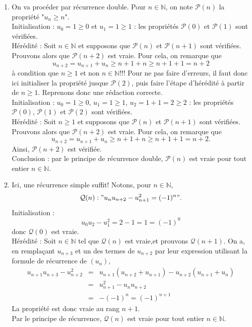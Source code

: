 \documentclass[11pt,a4paper]{article}
\begin{document}
	\begin{corrige}
		\begin{enumerate}
			
			\item  On va procéder par récurrence double. Pour $n\in\mathbb N$, on note $\mathcal P(n)$ la propriété "$u_n\geq n$".\\
			
			Initialisation : $u_0=1\geq 0$ et $u_1=1\geq 1$ : les propriétés $\mathcal P(0)$ et $\mathcal P(1)$ sont vérifiées.\\
			
			Hérédité : Soit $n\in\mathbb N$ et supposons que $\mathcal P(n)$ et $\mathcal P(n+1)$ sont vérifiées. Prouvons alors que $\mathcal P(n+2)$ est vraie. Pour cela, on remarque que 
			$$u_{n+2}=u_{n+1}+u_n\geq n+1+n\geq n+1+1=n+2$$
			à condition que $n\geq 1$ et non $n\in\mathbb N$!!! Pour ne pas faire d'erreurs, il faut donc ici initialiser la propriété jusque $\mathcal P(2)$, puis faire l'étape d'hérédité à partir de $n\geq 1$. Reprenons donc une rédaction correcte.\\
			
			Initialisation : $u_0=1\geq 0$, $u_1=1\geq 1$, $u_2=1+1=2\geq 2$ : les propriétés $\mathcal P(0)$, $\mathcal P(1)$ et $\mathcal P(2)$ sont vérifiées.\\
			
			Hérédité : Soit $n\geq 1$ et supposons que $\mathcal P(n)$ et $\mathcal P(n+1)$ sont vérifiées. Prouvons alors que $\mathcal P(n+2)$ est vraie. Pour cela, on remarque que 
			$$u_{n+2}=u_{n+1}+u_n\geq n+1+n\geq n+1+1=n+2.$$
			Ainsi, $\mathcal P(n+2)$ est vérifiée.\\
			
			Conclusion : par le principe de récurrence double, $\mathcal P(n)$ est vraie pour tout entier $n\in\mathbb N$.
			
			\item  Ici, une récurrence simple suffit! Notons, pour $n\in\mathbb N$, 
			$$\mathcal Q(n):"u_n u_{n+2}-u_{n+1}^2=(-1)^n".$$
			Initialisation : 
			$$u_0u_2-u_1^2=2-1=1=(-1)^0$$
			donc $\mathcal Q(0)$ est vraie.\\
			
			Hérédité : Soit $n\in\mathbb N$ tel que $\mathcal Q(n)$ est vraie,et prouvons $\mathcal Q(n+1)$. On a, en remplaçant $u_{n+3}$ et un des termes de $u_{n+2}$ par leur expression utilisant la formule de récurrence de $(u_n)$,
			\begin{eqnarray*}
				u_{n+1}u_{n+3}-u_{n+2}^2&=&u_{n+1}(u_{n+2}+u_{n+1})-u_{n+2}(u_{n+1}+u_n)\\
				&=&u_{n+1}^2-u_nu_{n+2}\\
				&=&-(-1)^n=(-1)^{n+1}
			\end{eqnarray*}
			La propriété est donc vraie au rang $n+1$.\\
			
			Par le principe de récurrence, $\mathcal Q(n)$ est vraie pour tout entier $n\in\mathbb N$.
			
		\end{enumerate}
	\end{corrige}
	
\end{document}
